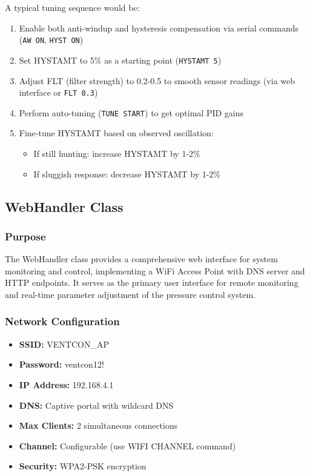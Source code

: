 \documentclass[12pt,a4paper]{article}
\begin{document}
A typical tuning sequence would be:

\begin{enumerate}
    \item Enable both anti-windup and hysteresis compensation via serial commands (\texttt{AW ON}, \texttt{HYST ON})
    \item Set HYSTAMT to 5\% as a starting point (\texttt{HYSTAMT 5})
    \item Adjust FLT (filter strength) to 0.2-0.5 to smooth sensor readings (via web interface or \texttt{FLT 0.3})
    \item Perform auto-tuning (\texttt{TUNE START}) to get optimal PID gains
    \item Fine-tune HYSTAMT based on observed oscillation:
    \begin{itemize}
        \item If still hunting: increase HYSTAMT by 1-2\%
        \item If sluggish response: decrease HYSTAMT by 1-2\%
    \end{itemize}
\end{enumerate}

\subsection{WebHandler Class}

\subsubsection{Purpose}
The WebHandler class provides a comprehensive web interface for system monitoring and control, implementing a WiFi Access Point with DNS server and HTTP endpoints. It serves as the primary user interface for remote monitoring and real-time parameter adjustment of the pressure control system.

\subsubsection{Network Configuration}
\begin{itemize}
    \item \textbf{SSID:} VENTCON\_AP
    \item \textbf{Password:} ventcon12!
    \item \textbf{IP Address:} 192.168.4.1
    \item \textbf{DNS:} Captive portal with wildcard DNS
    \item \textbf{Max Clients:} 2 simultaneous connections
    \item \textbf{Channel:} Configurable (use WIFI CHANNEL command)
    \item \textbf{Security:} WPA2-PSK encryption
\end{itemize}
\end{document}
